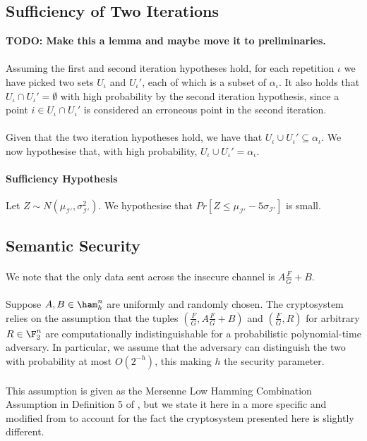 \subsection{Sufficiency of Two Iterations}
\textbf{TODO: Make this a lemma and maybe move it to preliminaries.}
\paragraph{}
Assuming the first and second iteration hypotheses hold, for each repetition $\iota$ we have picked two sets $U_\iota$ and $U_\iota'$, each of which is a subset of $\alpha_\iota$. It also holds that $U_\iota \cap U_\iota' = \emptyset$ with high probability by the second iteration hypothesis, since a point $i \in U_\iota \cap U_\iota'$ is considered an erroneous point in the second iteration.

\paragraph{}
Given that the two iteration hypotheses hold, we have that $U_\iota \cup U_\iota' \subseteq \alpha_\iota$. We now hypothesise that, with high probability, $U_\iota \cup U_\iota' = \alpha_\iota$.

\paragraph{\textbf{Sufficiency Hypothesis}} Let $Z \sim N(\mu_{\mathcal{I}'}, \sigma_{\mathcal{I}'}^2)$.
We hypothesise that $Pr[Z \leq \mu_{\mathcal{I}'} - 5 \sigma_{\mathcal{I}'}]$ is small.

\subsection{Semantic Security}
\paragraph{}
We note that the only data sent across the insecure channel is $A \frac{F}{G} + B$.

\paragraph{}
Suppose $A, B \in \ham_h^n$ are uniformly and randomly chosen. The cryptosystem relies on the assumption that the tuples $(\frac{F}{G}, A \frac{F}{G} + B)$ and $(\frac{F}{G}, R)$ for arbitrary $R \in \F_2^n$ are computationally indistinguishable for a probabilistic polynomial-time adversary. In particular, we assume that the adversary can distinguish the two with probability at most $O(2^{-h})$, this making $h$ the security parameter.

\paragraph{}
This assumption is given as the Mersenne Low Hamming Combination Assumption in Definition 5 of \cite{aggarwal2018new}, but we state it here in a more specific and modified from to account for the fact the cryptosystem presented here is slightly different.
